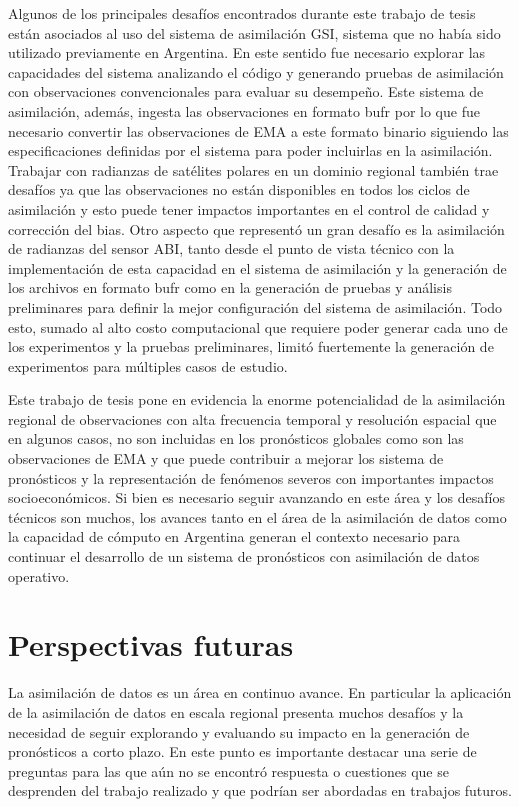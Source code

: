 \documentclass[12pt,oneside,a4paper]{reedthesis}
\begin{document}
Algunos de los principales desafíos encontrados durante este trabajo de tesis están asociados al uso del sistema de asimilación GSI, sistema que no había sido utilizado previamente en Argentina. En este sentido fue necesario explorar las capacidades del sistema analizando el código y generando pruebas de asimilación con observaciones convencionales para evaluar su desempeño. Este sistema de asimilación, además, ingesta las observaciones en formato bufr por lo que fue necesario convertir las observaciones de EMA a este formato binario siguiendo las especificaciones definidas por el sistema para poder incluirlas en la asimilación. Trabajar con radianzas de satélites polares en un dominio regional también trae desafíos ya que las observaciones no están disponibles en todos los ciclos de asimilación y esto puede tener impactos importantes en el control de calidad y corrección del bias. Otro aspecto que representó un gran desafío es la asimilación de radianzas del sensor ABI, tanto desde el punto de vista técnico con la implementación de esta capacidad en el sistema de asimilación y la generación de los archivos en formato bufr como en la generación de pruebas y análisis preliminares para definir la mejor configuración del sistema de asimilación. Todo esto, sumado al alto costo computacional que requiere poder generar cada uno de los experimentos y la pruebas preliminares, limitó fuertemente la generación de experimentos para múltiples casos de estudio.

Este trabajo de tesis pone en evidencia la enorme potencialidad de la asimilación regional de observaciones con alta frecuencia temporal y resolución espacial que en algunos casos, no son incluidas en los pronósticos globales como son las observaciones de EMA y que puede contribuir a mejorar los sistema de pronósticos y la representación de fenómenos severos con importantes impactos socioeconómicos. Si bien es necesario seguir avanzando en este área y los desafíos técnicos son muchos, los avances tanto en el área de la asimilación de datos como la capacidad de cómputo en Argentina generan el contexto necesario para continuar el desarrollo de un sistema de pronósticos con asimilación de datos operativo.

\hypertarget{perspectivas-futuras}{%
\section{Perspectivas futuras}\label{perspectivas-futuras}}

La asimilación de datos es un área en continuo avance. En particular la aplicación de la asimilación de datos en escala regional presenta muchos desafíos y la necesidad de seguir explorando y evaluando su impacto en la generación de pronósticos a corto plazo. En este punto es importante destacar una serie de preguntas para las que aún no se encontró respuesta o cuestiones que se desprenden del trabajo realizado y que podrían ser abordadas en trabajos futuros.
\end{document}
